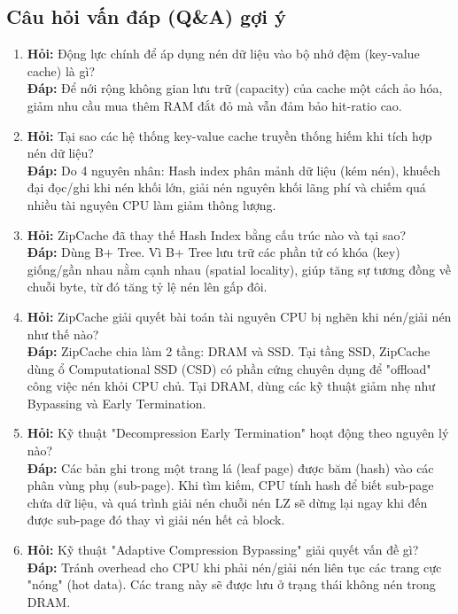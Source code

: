 \documentclass[12pt,a4paper]{article}
\begin{document}
\subsection{Câu hỏi vấn đáp (Q\&A) gợi ý}

\begin{enumerate}
    \item \textbf{Hỏi:} Động lực chính để áp dụng nén dữ liệu vào bộ nhớ đệm (key-value cache) là gì? \\
    \textbf{Đáp:} Để nới rộng không gian lưu trữ (capacity) của cache một cách ảo hóa, giảm nhu cầu mua thêm RAM đắt đỏ mà vẫn đảm bảo hit-ratio cao.
    
    \item \textbf{Hỏi:} Tại sao các hệ thống key-value cache truyền thống hiếm khi tích hợp nén dữ liệu? \\
    \textbf{Đáp:} Do 4 nguyên nhân: Hash index phân mảnh dữ liệu (kém nén), khuếch đại đọc/ghi khi nén khối lớn, giải nén nguyên khối lãng phí và chiếm quá nhiều tài nguyên CPU làm giảm thông lượng.
    
    \item \textbf{Hỏi:} ZipCache đã thay thế Hash Index bằng cấu trúc nào và tại sao? \\
    \textbf{Đáp:} Dùng B+ Tree. Vì B+ Tree lưu trữ các phần tử có khóa (key) giống/gần nhau nằm cạnh nhau (spatial locality), giúp tăng sự tương đồng về chuỗi byte, từ đó tăng tỷ lệ nén lên gấp đôi.
    
    \item \textbf{Hỏi:} ZipCache giải quyết bài toán tài nguyên CPU bị nghẽn khi nén/giải nén như thế nào? \\
    \textbf{Đáp:} ZipCache chia làm 2 tầng: DRAM và SSD. Tại tầng SSD, ZipCache dùng ổ Computational SSD (CSD) có phần cứng chuyên dụng để "offload" công việc nén khỏi CPU chủ. Tại DRAM, dùng các kỹ thuật giảm nhẹ như Bypassing và Early Termination.
    
    \item \textbf{Hỏi:} Kỹ thuật "Decompression Early Termination" hoạt động theo nguyên lý nào? \\
    \textbf{Đáp:} Các bản ghi trong một trang lá (leaf page) được băm (hash) vào các phân vùng phụ (sub-page). Khi tìm kiếm, CPU tính hash để biết sub-page chứa dữ liệu, và quá trình giải nén chuỗi nén LZ sẽ dừng lại ngay khi đến được sub-page đó thay vì giải nén hết cả block.
    
    \item \textbf{Hỏi:} Kỹ thuật "Adaptive Compression Bypassing" giải quyết vấn đề gì? \\
    \textbf{Đáp:} Tránh overhead cho CPU khi phải nén/giải nén liên tục các trang cực "nóng" (hot data). Các trang này sẽ được lưu ở trạng thái không nén trong DRAM.
    

\end{enumerate}
\end{document}
